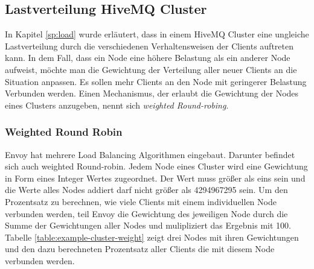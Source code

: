 \subsection{Lastverteilung HiveMQ Cluster}

In Kapitel \ref{sp:load} wurde erläutert, dass in einem HiveMQ Cluster eine ungleiche Lastverteilung durch die verschiedenen Verhaltensweisen der Clients auftreten kann.
In dem Fall, dass ein Node eine höhere Belastung als ein anderer Node aufweist, möchte man die Gewichtung der Verteilung aller neuer Clients an die Situation anpassen. Es sollen mehr Clients an den Node mit geringerer Belastung Verbunden werden.
Einen Mechanismus, der erlaubt die Gewichtung der Nodes eines Clusters anzugeben, nennt sich \textit{weighted Round-robing}.

\subsubsection{Weighted Round Robin}
Envoy hat mehrere Load Balancing Algorithmen eingebaut. Darunter befindet sich auch weighted Round-robin. Jedem Node eines Cluster wird eine Gewichtung in Form eines Integer Wertes zugeordnet. Der Wert muss grö{\ss}er als eins sein und die Werte alles Nodes addiert darf nicht grö{\ss}er als 4294967295 sein.
Um den Prozentsatz zu berechnen, wie viele Clients mit einem individuellen Node verbunden werden, teil Envoy die Gewichtung des jeweiligen Node durch die Summe der Gewichtungen aller Nodes und mulipliziert das Ergebnis mit 100.
\cite{SupportedLoadBalancers}
\\
Tabelle \ref{table:example-cluster-weight} zeigt drei Nodes mit ihren Gewichtungen und den dazu berechneten Prozentsatz aller Clients die mit diesem Node verbunden werden.

